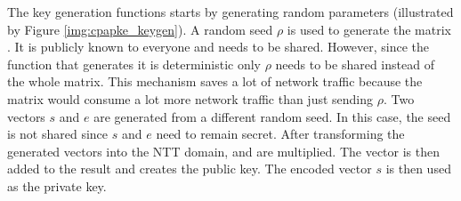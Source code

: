 The key generation functions starts by generating random parameters (illustrated by Figure \ref{img:cpapke_keygen}). A random seed $\rho$ is used to generate the matrix . It is publicly known to everyone and needs to be shared. However, since the function that generates it is deterministic only $\rho$ needs to be shared instead of the whole matrix. This mechanism saves a lot of network traffic because the matrix  would consume a lot more network traffic than just sending $\rho$. Two vectors $s$ and $e$ are generated from a different random seed. In this case, the seed is not shared since $s$ and $e$ need to remain secret. After transforming the generated vectors into the NTT domain,  and  are multiplied. The vector  is then added to the result and creates the public key. The encoded vector $s$ is then used as the private key.

